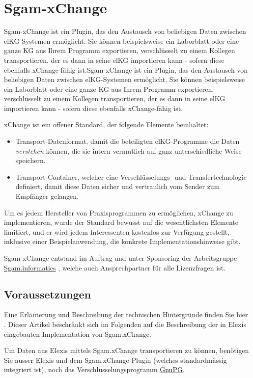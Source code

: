 \section{Sgam-xChange}
Sgam-xChange ist ein Plugin, das den Austausch von beliebigen Daten zwischen elKG-Systemen ermöglicht. Sie können beispielsweise ein Laborblatt oder eine ganze KG aus Ihrem Programm exportieren, verschlüsselt zu einem Kollegen transportieren, der es dann in seine elKG importieren kann - sofern diese ebenfalls xChange-fähig ist.Sgam-xChange ist ein Plugin, das den Austausch von beliebigen Daten zwischen elKG-Systemen ermöglicht. Sie können beispielsweise ein Laborblatt oder eine ganze KG aus Ihrem Programm exportieren, verschlüsselt zu einem Kollegen transportieren, der es dann in seine elKG importieren kann - sofern diese ebenfalls xChange-fähig ist.

xChange ist ein offener Standard, der folgende Elemente beinhaltet:
\begin{itemize}
 \item Transport-Datenformat, damit die beteiligten elKG-Programme die Daten \textit{verstehen} können, die sie intern vermutlich auf ganz unterschiedliche Weise speichern.
\item Transport-Container, welcher eine Verschlüsselungs- und Transfertechnologie definiert, damit diese Daten sicher und vertraulich vom Sender zum Empfänger gelangen.
\end{itemize}
Um es jedem Hersteller von Praxisprogrammen zu ermöglichen, xChange zu implementieren, wurde der Standard bewusst auf die wesentlichsten Elemente limitiert, und er wird jedem Interessenten kostenlos zur Verfügung gestellt, inklusive einer Beispielanwendung, die konkrete Implementationshinweise gibt.

Sgam-xChange entstand im Auftrag und unter Sponsoring der Arbeitsgruppe \href{http://www.sgam.ch/informatics}{Sgam.informatics} , welche auch Ansprechpartner für alle Lizenzfragen ist.

\subsection{Voraussetzungen}


Eine Erläuterung und Beschreibung der technischen Hintergründe finden Sie hier .
 Dieser Artikel beschränkt sich im Folgenden auf die Beschreibung der in Elexis eingebauten Implementation von Sgam.xChange.

Um Daten aus Elexis mittels Sgam.xChange transportieren zu können, benötigen Sie ausser Elexis und dem Sgam.xChange-Plugin (welches standardmässig integriert ist), noch das Verschlüsselungsprogramm \href{http://www.gnupg.org}{GnuPG}.


